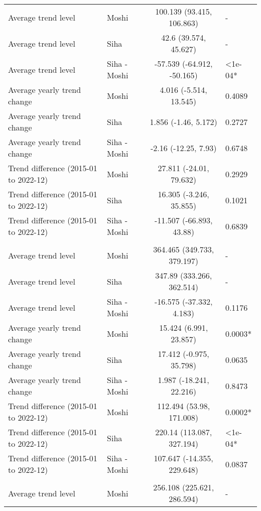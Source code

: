 \begin{longtable}{l|lcl}
\midrule\addlinespace[2.5pt]
\multicolumn{4}{l}{Other Cardiovascular Diseases} \\[2.5pt] 
\midrule\addlinespace[2.5pt]
Average trend level & Moshi & 100.139 (93.415, 106.863) & - \\ 
Average trend level & Siha & 42.6 (39.574, 45.627) & - \\ 
Average trend level & Siha - Moshi & -57.539 (-64.912, -50.165) & <1e-04* \\ 
Average yearly trend change & Moshi & 4.016 (-5.514, 13.545) & 0.4089 \\ 
Average yearly trend change & Siha & 1.856 (-1.46, 5.172) & 0.2727 \\ 
Average yearly trend change & Siha - Moshi & -2.16 (-12.25, 7.93) & 0.6748 \\ 
Trend difference (2015-01 to 2022-12) & Moshi & 27.811 (-24.01, 79.632) & 0.2929 \\ 
Trend difference (2015-01 to 2022-12) & Siha & 16.305 (-3.246, 35.855) & 0.1021 \\ 
Trend difference (2015-01 to 2022-12) & Siha - Moshi & -11.507 (-66.893, 43.88) & 0.6839 \\ 
\midrule\addlinespace[2.5pt]
\multicolumn{4}{l}{Peptic Ulcers} \\[2.5pt] 
\midrule\addlinespace[2.5pt]
Average trend level & Moshi & 364.465 (349.733, 379.197) & - \\ 
Average trend level & Siha & 347.89 (333.266, 362.514) & - \\ 
Average trend level & Siha - Moshi & -16.575 (-37.332, 4.183) & 0.1176 \\ 
Average yearly trend change & Moshi & 15.424 (6.991, 23.857) & 0.0003* \\ 
Average yearly trend change & Siha & 17.412 (-0.975, 35.798) & 0.0635 \\ 
Average yearly trend change & Siha - Moshi & 1.987 (-18.241, 22.216) & 0.8473 \\ 
Trend difference (2015-01 to 2022-12) & Moshi & 112.494 (53.98, 171.008) & 0.0002* \\ 
Trend difference (2015-01 to 2022-12) & Siha & 220.14 (113.087, 327.194) & <1e-04* \\ 
Trend difference (2015-01 to 2022-12) & Siha - Moshi & 107.647 (-14.355, 229.648) & 0.0837 \\ 
\midrule\addlinespace[2.5pt]
\multicolumn{4}{l}{Pneumonia, Severe} \\[2.5pt] 
\midrule\addlinespace[2.5pt]
Average trend level & Moshi & 256.108 (225.621, 286.594) & - \\ 

\end{longtable}
